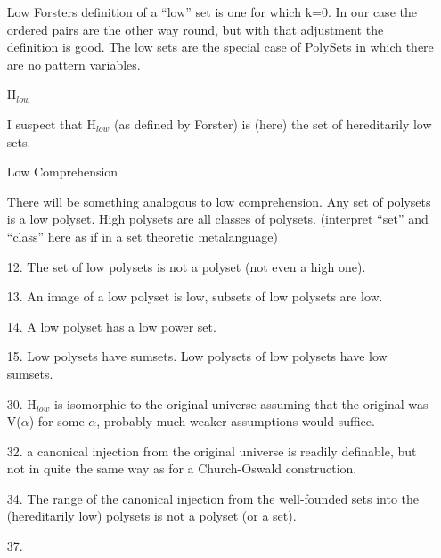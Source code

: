\documentclass[numreferences]{rbjk}
\begin{document}
\begin{article}
\begin{itemize}
\begin{itemize}
\item[Low] Forsters definition of a ``low'' set is one for which k=0.
In our case the ordered pairs are the other way round, but with that adjustment the definition is good.
The low sets are the special case of PolySets in which there are no pattern variables.

\item[H$_{low}$]\ 

I suspect that H$_{low}$ (as defined by Forster\cite{forster2005}) is (here) the set of hereditarily low sets.

\item[Low Comprehension]\ 

There will be something analogous to low comprehension.
Any set of polysets is a low polyset.
High polysets are all classes of polysets.
(interpret ``set'' and ``class'' here as if in a set theoretic metalanguage)

\item[12.] The set of low polysets is not a polyset (not even a high one).

\item[13.] An image of a low polyset is low, subsets of low polysets are low.

\item[14.] A low polyset has a low power set.

\item[15.] Low polysets have sumsets. Low polysets of low polysets have low sumsets.

\item[30.] H$_{low}$ is isomorphic to the original universe assuming that the original was V($\alpha$) for some $\alpha$, probably much weaker assumptions would suffice.

\item[32.] a canonical injection from the original universe is readily definable, but not in quite the same way as for a Church-Oswald construction.

\item[34.] The range of the canonical injection from the well-founded sets into the (hereditarily low) polysets is not a polyset (or a set).

\item[37.] 

\end{itemize}
\end{itemize}

{\raggedright


} %


\end{article}
\end{document}
